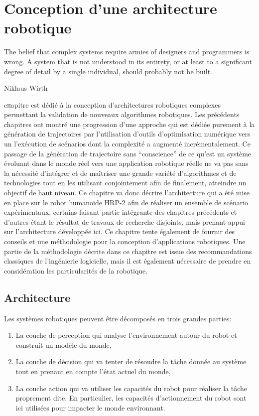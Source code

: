 \chapter{Conception d'une architecture robotique}
\label{chap:integration}

\epigraph{\foreignlanguage{USenglish}{The belief that complex systems
    require armies of designers and programmers is wrong. A system
    that is not understood in its entirety, or at least to a
    significant degree of detail by a single individual, should
    probably not be built.}}{Niklaus Wirth}
\clearpage

\lettrine[lines=2, lraise=0.1, nindent=0em, slope=-.5em]%
chapitre est dédié à la conception d'architectures robotiques
complexes permettant la validation de nouveaux algorithmes robotiques.
Les précédents chapitres ont montré une progression d'une approche qui
est dédiée purement à la génération de trajectoires par l'utilisation
d'outils d'optimisation numérique vers un l'exécution de scénarios
dont la complexité a augmenté incrémentalement. Ce passage de la
génération de trajectoire sans ``conscience'' de ce qu'est un système
évoluant dans le monde réel vers une application robotique réelle ne
va pas sans la nécessité d'intégrer et de maîtriser une grande variété
d'algorithmes et de technologies tout en les utilisant conjointement
afin de finalement, atteindre un objectif de haut niveau. Ce chapitre
va donc décrire l'architecture qui a été mise en place sur le robot
humanoïde HRP-2 afin de réaliser un ensemble de scénario
expérimentaux, certains faisant partie intégrante des chapitres
précédents et d'autres étant le résultat de travaux de recherche
disjoints, mais prenant appui sur l'architecture développée ici. Ce
chapitre tente également de fournir des conseils et une méthodologie
pour la conception d'applications robotiques. Une partie de la
méthodologie décrite dans ce chapitre est issue des recommandations
classiques de l'ingénierie logicielle, mais il est également
nécessaire de prendre en considération les particularités de la
robotique.

\section{Architecture}


Les systèmes robotiques peuvent être décomposés en trois grandes
parties:

\begin{enumerate}
\item La couche de perception qui analyse
  l'environnement autour du robot et construit un modèle du monde,
\item La couche de décision qui va tenter de résoudre
  la tâche donnée au système tout en prenant en compte l'état actuel
  du monde,
\item La couche action qui va utiliser les capacités du robot pour
  réaliser la tâche proprement dite. En particulier, les capacités
  d'actionnement du robot sont ici utilisées pour impacter le monde
  environnant.
\end{enumerate}


